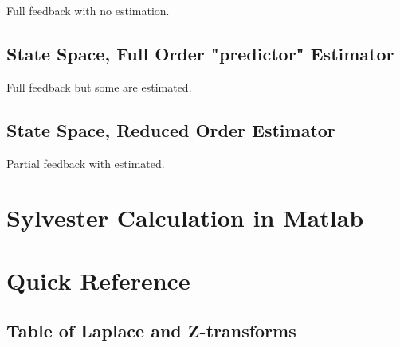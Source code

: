\documentclass{article}
\begin{document}
Full feedback with no estimation.

\subsection{State Space, Full Order "predictor" Estimator}

Full feedback but some are estimated.

\subsection{State Space, Reduced Order Estimator}

Partial feedback with estimated.

\clearpage
\printbibliography[heading=bibintoc]

\clearpage
\appendix

\section{Sylvester Calculation in Matlab}




\section{Quick Reference}

\subsection{Table of Laplace and Z-transforms}
\end{document}
